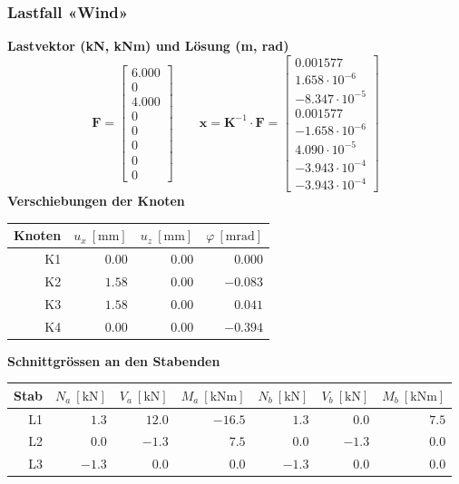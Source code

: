 \documentclass[11pt,a4paper]{article}
\begin{document}
\subsubsection{Lastfall «Wind»}
\noindent\textbf{Lastvektor (kN, kNm) und Lösung (m, rad)}
\begin{equation*}
\mathbf{F} = \begin{bmatrix} 6.000 \\ 0 \\ 4.000 \\ 0 \\ 0 \\ 0 \\ 0 \\ 0 \end{bmatrix} \qquad \mathbf{x} = \mathbf{K}^{-1} \cdot \mathbf{F} = \begin{bmatrix} 0.001577 \\ 1.658 \cdot 10^{-6} \\ -8.347 \cdot 10^{-5} \\ 0.001577 \\ -1.658 \cdot 10^{-6} \\ 4.090 \cdot 10^{-5} \\ -3.943 \cdot 10^{-4} \\ -3.943 \cdot 10^{-4} \end{bmatrix}
\end{equation*}
\noindent\textbf{Verschiebungen der Knoten}
\begin{longtable}{rrrr}
\hline
Knoten & $u_x\ [\mathrm{mm}]$ & $u_z\ [\mathrm{mm}]$ & $\varphi\ [\mathrm{mrad}]$ \\
\hline
\endhead
K1 & $0.00$ & $0.00$ & $0.000$ \\
K2 & $1.58$ & $0.00$ & $-0.083$ \\
K3 & $1.58$ & $0.00$ & $0.041$ \\
K4 & $0.00$ & $0.00$ & $-0.394$ \\
\hline
\end{longtable}
\noindent\textbf{Schnittgrössen an den Stabenden}
\begin{longtable}{rrrrrrr}
\hline
Stab & $N_{a}\ [\mathrm{kN}]$ & $V_{a}\ [\mathrm{kN}]$ & $M_{a}\ [\mathrm{kNm}]$ & $N_{b}\ [\mathrm{kN}]$ & $V_{b}\ [\mathrm{kN}]$ & $M_{b}\ [\mathrm{kNm}]$ \\
\hline
\endhead
L1 & $1.3$ & $12.0$ & $-16.5$ & $1.3$ & $0.0$ & $7.5$ \\
L2 & $0.0$ & $-1.3$ & $7.5$ & $0.0$ & $-1.3$ & $0.0$ \\
L3 & $-1.3$ & $0.0$ & $0.0$ & $-1.3$ & $0.0$ & $0.0$ \\
\hline
\end{longtable}
\end{document}
